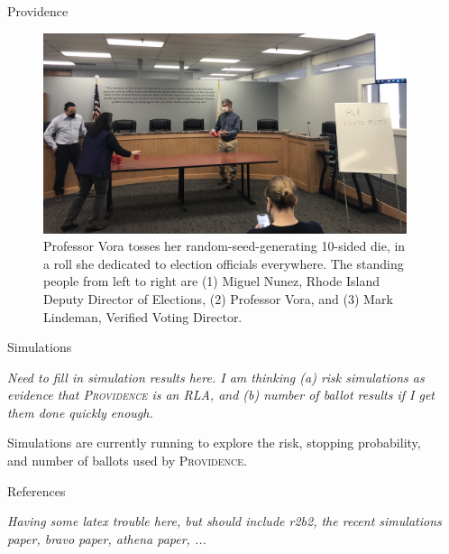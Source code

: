 \documentclass[final]{beamer}
\newcommand{\Prov}{\textsc{Providence}\xspace}
\newlength{\sepwidth}
\newlength{\colwidth}
\newcommand{\separatorcolumn}{\begin{column}{\sepwidth}\end{column}}
\begin{document}
\begin{frame}[t]
\begin{columns}[t]
\begin{column}{\colwidth}
\begin{block}{Providence}
\begin{figure}
\includegraphics[width=1.0\textwidth]{dice.jpg}
\caption{
Professor Vora tosses her random-seed-generating 10-sided die, in a roll she dedicated to election officials everywhere.
The standing people from left to right are (1) Miguel Nunez, Rhode Island Deputy Director of Elections, 
(2) Professor Vora, and (3) Mark Lindeman, Verified Voting Director.
}
\end{figure}

\end{block}

\begin{block}{Simulations}

\emph{Need to fill in simulation results here. I am thinking (a) risk simulations as evidence that \Prov is an RLA, and (b) number of ballot results if I get them done quickly enough.}

Simulations are currently running to explore the risk, stopping probability, and number of ballots used by \Prov.

\end{block}



  \begin{block}{References}

    
    
    \emph{Having some latex trouble here, but should include r2b2, the recent simulations paper, bravo paper, athena paper, ...}

  \end{block}


\end{column}

\separatorcolumn

\end{columns}

\end{frame}
\end{document}
